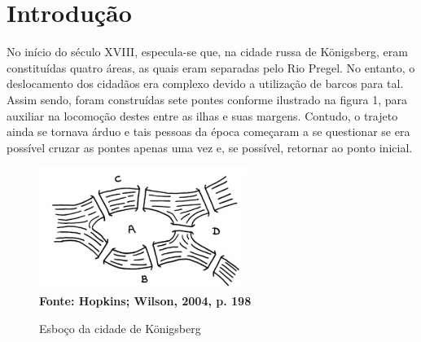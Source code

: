 \section{\esp Introdução}

No início do século XVIII, especula-se que, na cidade russa de Königsberg, eram constituídas quatro áreas, as quais eram separadas pelo Rio Pregel. No entanto, o deslocamento dos cidadãos era complexo devido a utilização de barcos para tal. Assim sendo, foram construídas sete pontes conforme ilustrado na figura 1, para auxiliar na locomoção destes entre as ilhas e suas margens. Contudo, o trajeto ainda se tornava árduo e tais pessoas da época começaram a se questionar se era possível cruzar as pontes apenas uma vez e, se possível, retornar ao ponto inicial.

\begin{figure}[ht]
	\centering	
	\caption[\hspace{0.1cm}Esboço da cidade de Königsberg.]{Esboço da cidade de Königsberg}
	\vspace{-0.4cm}
	\includegraphics[width=0.6\textwidth]{figuras/cidade.png}
	 \vspace{-0.2cm}
	\\\textbf{\footnotesize Fonte: Hopkins; Wilson, 2004, p. 198}
	\label{fig:figura1}
\end{figure}

